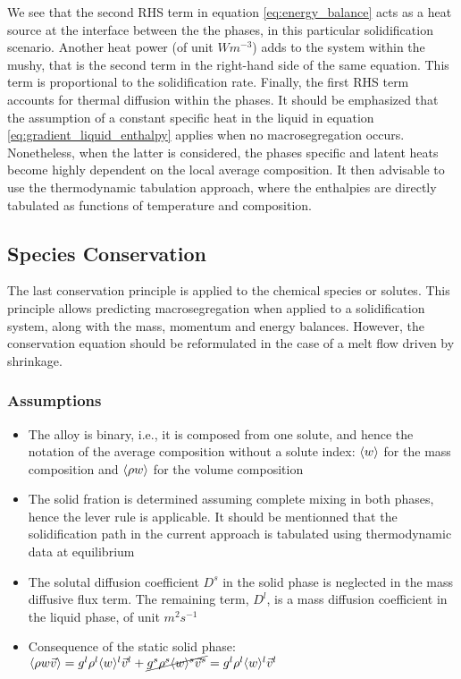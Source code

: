 We see that the second RHS term in equation \eqref{eq:energy_balance} acts as 
a heat source at the interface between the the phases, in this particular solidification
scenario. Another heat power (of unit $Wm^{-3}$) adds to the system within the mushy, 
that is the second term in the right-hand side of the same equation. This term is 
proportional to the solidification rate. Finally, the first RHS term accounts for thermal 
diffusion within the phases.
\newline
It should be emphasized that the assumption of a constant specific heat in the liquid in 
equation \eqref{eq:gradient_liquid_enthalpy} applies when no macrosegregation occurs. 
Nonetheless, when the latter is considered, the phases specific and latent heats become 
highly dependent on the local average composition. It then advisable to use the thermodynamic 
tabulation approach, where the enthalpies are directly tabulated as functions of temperature 
and composition. 
\subsection{Species Conservation}
The last conservation principle is applied to the chemical species or solutes. This principle allows predicting
macrosegregation when applied to a solidification system, along with the mass, momentum and energy balances.
However, the conservation equation should be reformulated in the case of a melt flow driven by shrinkage.
\subsubsection{Assumptions}
\begin{itemize}
\item The alloy is binary, i.e., it is composed from one solute, and hence the notation of the average composition
		without a solute index: $\langle w \rangle$ for the mass composition and $\langle \rho w \rangle$ for the volume composition
\item The solid fration is determined assuming complete mixing in both phases, hence the lever rule is applicable. It
		should be mentionned that the solidification path in the current approach is tabulated using thermodynamic data at 
		equilibrium
\item The solutal diffusion coefficient $D^s$ in the solid phase is neglected in the mass diffusive flux term. The
		remaining term, $D^l$, is a mass diffusion coefficient in the liquid phase, of unit $m^2 s^{-1}$
\item Consequence of the static solid phase: $\langle \rho w \vec{v} \rangle = {g^l} \rho^l \langle w \rangle^l \vec{v}^l +  \cancel{{g^s} \rho^s \langle w \rangle^s \vec{v}^s} = {g^l} \rho^l \langle w \rangle^l \vec{v}^l$ 
\end{itemize}
